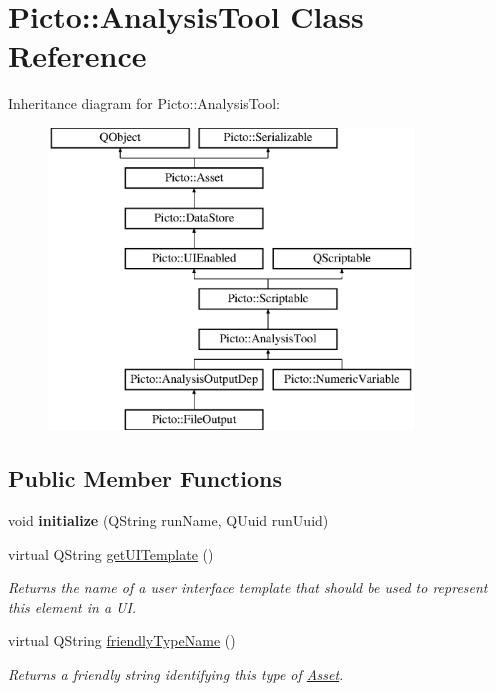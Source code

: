 \hypertarget{class_picto_1_1_analysis_tool}{\section{Picto\-:\-:Analysis\-Tool Class Reference}
\label{class_picto_1_1_analysis_tool}
}
Inheritance diagram for Picto\-:\-:Analysis\-Tool\-:\begin{figure}[H]
\begin{center}
\leavevmode
\includegraphics[height=8.000000cm]{class_picto_1_1_analysis_tool}
\end{center}
\end{figure}
\subsection*{Public Member Functions}
\begin{DoxyCompactItemize}
\item 
\hypertarget{class_picto_1_1_analysis_tool_a5672acb24b3aea043c41826e439cb918}{void {\bfseries initialize} (Q\-String run\-Name, Q\-Uuid run\-Uuid)}\label{class_picto_1_1_analysis_tool_a5672acb24b3aea043c41826e439cb918}

\item 
\hypertarget{class_picto_1_1_analysis_tool_acd60a275d5bdcde0e1b22f3a0b158306}{virtual Q\-String \hyperlink{class_picto_1_1_analysis_tool_acd60a275d5bdcde0e1b22f3a0b158306}{get\-U\-I\-Template} ()}\label{class_picto_1_1_analysis_tool_acd60a275d5bdcde0e1b22f3a0b158306}

\begin{DoxyCompactList}\small\item\em Returns the name of a user interface template that should be used to represent this element in a U\-I. \end{DoxyCompactList}\item 
virtual Q\-String \hyperlink{class_picto_1_1_analysis_tool_a97a573c5f8459e976736a4b2c3c145d2}{friendly\-Type\-Name} ()
\begin{DoxyCompactList}\small\item\em Returns a friendly string identifying this type of \hyperlink{class_picto_1_1_asset}{Asset}. \end{DoxyCompactList}\end{DoxyCompactItemize}
